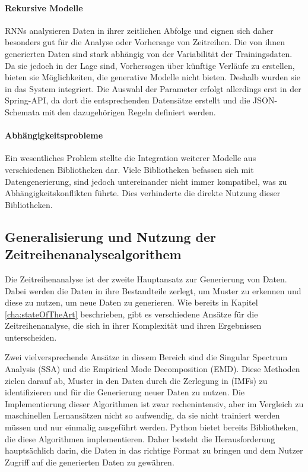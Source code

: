 \paragraph{Rekursive Modelle}
\acp{RNN} analysieren Daten in ihrer zeitlichen Abfolge und eignen sich daher besonders gut für die Analyse oder Vorhersage von Zeitreihen. Die von ihnen generierten Daten sind stark abhängig von der Variabilität der Trainingsdaten. 
Da sie jedoch in der Lage sind, Vorhersagen über künftige Verläufe zu erstellen, bieten sie Möglichkeiten, die generative Modelle nicht bieten. Deshalb wurden sie in das System integriert. Die Auswahl der Parameter erfolgt allerdings erst in der Spring-API, 
da dort die entsprechenden Datensätze erstellt und die JSON-Schemata mit den dazugehörigen Regeln definiert werden.

\paragraph{Abhängigkeitsprobleme}
Ein wesentliches Problem stellte die Integration weiterer Modelle aus verschiedenen Bibliotheken dar. Viele Bibliotheken befassen sich mit Datengenerierung, sind jedoch untereinander nicht immer kompatibel, was zu Abhängigkeitskonflikten führte. 
Dies verhinderte die direkte Nutzung dieser Bibliotheken.

\subsection{Generalisierung und Nutzung der Zeitreihenanalysealgorithem}
\label{sec:djangoTSA}

Die Zeitreihenanalyse ist der zweite Hauptansatz zur Generierung von Daten. Dabei werden die Daten in ihre Bestandteile zerlegt, um Muster zu erkennen und diese zu nutzen, um neue Daten zu generieren. 
Wie bereits in Kapitel \ref{cha:stateOfTheArt} beschrieben, gibt es verschiedene Ansätze für die Zeitreihenanalyse, die sich in ihrer Komplexität und ihren Ergebnissen unterscheiden.

Zwei vielversprechende Ansätze in diesem Bereich sind die Singular Spectrum Analysis (\ac{SSA}) und die Empirical Mode Decomposition (\ac{EMD}). Diese Methoden zielen darauf ab, Muster in den Daten durch die Zerlegung in 
(\acp{IMF}) zu identifizieren und für die Generierung neuer Daten zu nutzen. Die Implementierung dieser Algorithmen ist zwar rechenintensiv, aber im Vergleich zu maschinellen Lernansätzen nicht so aufwendig, da sie nicht trainiert werden 
müssen und nur einmalig ausgeführt werden. Python bietet bereits Bibliotheken, die diese Algorithmen implementieren. Daher besteht die Herausforderung hauptsächlich darin, die Daten in das richtige Format zu bringen und dem Nutzer Zugriff auf die 
generierten Daten zu gewähren.

